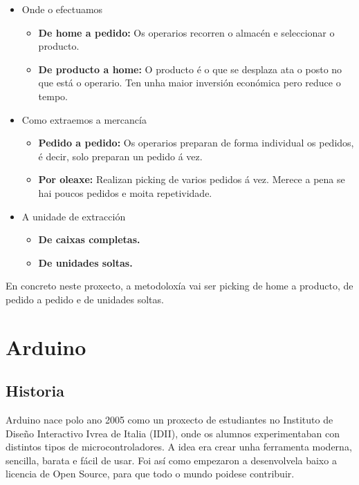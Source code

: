 \documentclass[11pt,twoside]{book}
\begin{document}
\begin{itemize}
    \item Onde o efectuamos
        \begin{itemize}
            \item \textbf{De home a pedido:} Os operarios recorren o almacén e seleccionar o producto. 
            \item \textbf{De producto a home:} O producto é o que se desplaza ata o posto no que está o operario. Ten unha maior inversión económica pero reduce o tempo.
        \end{itemize}
    \item Como extraemos a mercancía
        \begin{itemize}
            \item \textbf{Pedido a pedido: } Os operarios preparan de forma individual os pedidos, é decir, solo preparan un pedido á vez. 
            \item \textbf{Por oleaxe: } Realizan picking de varios pedidos á vez. Merece a pena se hai poucos pedidos e moita repetividade. 
        \end{itemize}
    \item A unidade de extracción
        \begin{itemize}
            \item \textbf{De caixas completas.}
            \item \textbf{De unidades soltas.}
        \end{itemize}
\end{itemize}

En concreto neste proxecto, a metodoloxía vai ser picking de home a producto, de pedido a pedido e de unidades soltas.

\section{Arduino}
\subsection{Historia}

Arduino nace polo ano 2005 como un proxecto de estudiantes no Instituto de Diseño Interactivo Ivrea de Italia (IDII), onde os alumnos experimentaban con distintos tipos de microcontroladores. A idea era crear unha ferramenta moderna, sencilla, barata e fácil de usar. Foi así como empezaron a desenvolvela baixo a licencia de Open Source, para que todo o mundo poidese contribuir. \cite{wArduino}
\end{document}
